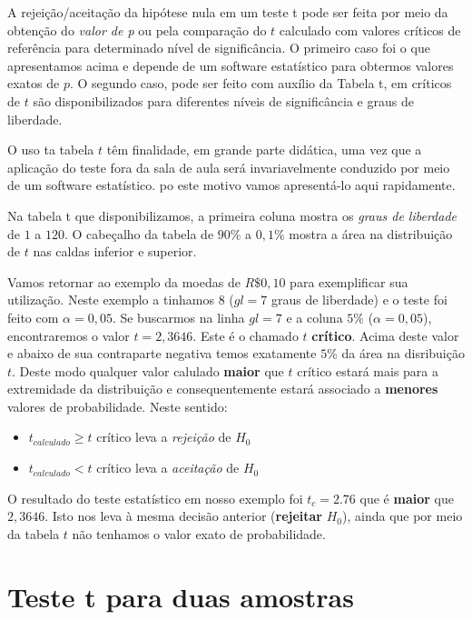 \documentclass[
]{book}
\providecommand{\tightlist}{%
  \setlength{\itemsep}{0pt}\setlength{\parskip}{0pt}}
\begin{document}
A rejeição/aceitação da hipótese nula em um teste t pode ser feita por meio da obtenção do \emph{valor de p} ou pela comparação do \(t\) calculado com valores críticos de referência para determinado nível de significância. O primeiro caso foi o que apresentamos acima e depende de um software estatístico para obtermos valores exatos de \(p\). O segundo caso, pode ser feito com auxílio da Tabela t, em críticos de \(t\) são disponibilizados para diferentes níveis de significância e graus de liberdade.

O uso ta tabela \(t\) têm finalidade, em grande parte didática, uma vez que a aplicação do teste fora da sala de aula será invariavelmente conduzido por meio de um software estatístico. po este motivo vamos apresentá-lo aqui rapidamente.

Na tabela t que disponibilizamos, a primeira coluna mostra os \emph{graus de liberdade} de \(1\) a \(120\). O cabeçalho da tabela de \(90\%\) a \(0,1\%\) mostra a área na distribuição de \(t\) nas caldas inferior e superior.

Vamos retornar ao exemplo da moedas de \(R\$0,10\) para exemplificar sua utilização. Neste exemplo a tinhamos \(8\) (\(gl = 7\) graus de liberdade) e o teste foi feito com \(\alpha =0,05\). Se buscarmos na linha \(gl = 7\) e a coluna \(5\%\) (\(\alpha = 0,05\)), encontraremos o valor \(t = 2,3646\). Este é o chamado \(t\) \textbf{crítico}. Acima deste valor e abaixo de sua contraparte negativa temos exatamente \(5\%\) da área na disribuição \(t\). Deste modo qualquer valor calulado \textbf{maior} que \(t\) crítico estará mais para a extremidade da distribuição e consequentemente estará associado a \textbf{menores} valores de probabilidade. Neste sentido:

\begin{itemize}
\tightlist
\item
  \(t_{calculado} \ge t\) crítico leva a \emph{rejeição} de \(H_0\)
\item
  \(t_{calculado} < t\) crítico leva a \emph{aceitação} de \(H_0\)
\end{itemize}

O resultado do teste estatístico em nosso exemplo foi \(t_c = 2.76\) que é \textbf{maior} que \(2,3646\). Isto nos leva à mesma decisão anterior (\textbf{rejeitar} \(H_0\)), ainda que por meio da tabela \(t\) não tenhamos o valor exato de probabilidade.

\hypertarget{testet}{%
\chapter{Teste t para duas amostras}\label{testet}}
\end{document}
